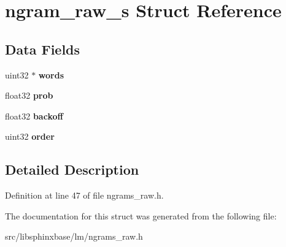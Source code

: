 \section{ngram\-\_\-raw\-\_\-s Struct Reference}
\label{structngram__raw__s}
\subsection*{Data Fields}
\begin{DoxyCompactItemize}
\item 
uint32 $\ast$ {\bfseries words}\label{structngram__raw__s_a6d359802e98a78c90e1a1d823db5f8d7}

\item 
float32 {\bfseries prob}\label{structngram__raw__s_aaf6462a153d3c4a99d15c61a786bddc2}

\item 
float32 {\bfseries backoff}\label{structngram__raw__s_a6d7c89d1d644fbd7c710d30a137f5b38}

\item 
uint32 {\bfseries order}\label{structngram__raw__s_ac410c26b5c6f9f7b4514da20eacb2a0b}

\end{DoxyCompactItemize}


\subsection{Detailed Description}


Definition at line 47 of file ngrams\-\_\-raw.\-h.



The documentation for this struct was generated from the following file\-:\begin{DoxyCompactItemize}
\item 
src/libsphinxbase/lm/ngrams\-\_\-raw.\-h\end{DoxyCompactItemize}
